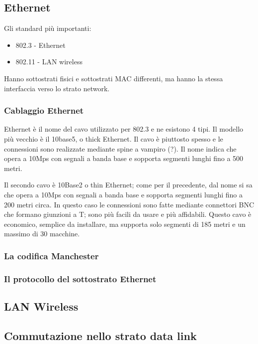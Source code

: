 \subsection{Ethernet} %
Gli standard più importanti:
\begin{itemize}
\item 802.3 - Ethernet
\item 802.11 - LAN wireless
\end{itemize}
Hanno sottostrati fisici e sottostrati MAC differenti, ma hanno la stessa interfaccia verso lo strato network.

\subsubsection{Cablaggio Ethernet}
Ethernet è il nome del cavo utilizzato per 802.3 e ne esistono 4 tipi.
Il modello più vecchio è il 10base5, o thick Ethernet.
Il cavo è piuttosto spesso e le connessioni sono realizzate mediante spine a vampiro (?).
Il nome indica che opera a 10Mps con segnali a banda base e sopporta segmenti lunghi fino a 500 metri.

Il secondo cavo è 10Base2 o thin Ethernet;
come per il precedente, dal nome si sa che opera a 10Mps con segnali a banda base e sopporta segmenti lunghi fino a 200 metri circa.
In questo caso le connessioni sono fatte mediante connettori BNC che formano giunzioni a T; sono più facili da usare e più affidabili.
Questo cavo è economico, semplice da installare, ma supporta solo segmenti di 185 metri e un massimo di 30 macchine.





\subsubsection{La codifica Manchester}

\subsubsection{Il protocollo del sottostrato Ethernet}



\subsection{LAN Wireless} %

\subsection{Commutazione nello strato data link} %

